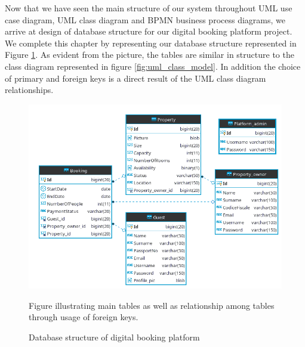 Now that we have seen the main structure of our system throughout UML use case diagram, UML class diagram and BPMN business process diagrams, we arrive at design of database structure for our digital booking platform project. We complete this chapter by representing our database structure represented in Figure \ref{fig:database_diagram}. As evident from the picture, the tables are similar in structure to the class diagram represented in figure \ref{fig:uml_class_model}. In addition the choice of primary and foreign keys is a direct result of the UML class diagram relationships.

\begin{figure} 
\centering
\includegraphics[width=14cm]{pictures/database_diagram.png}
\caption{Database structure of digital booking platform}
Figure illustrating main tables as well as relationship among tables through usage of foreign keys.
\label{fig:database_diagram}
\end{figure}




